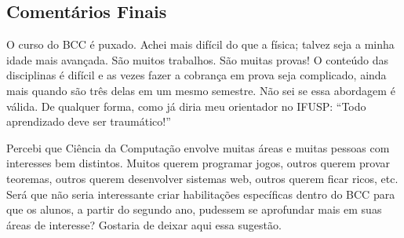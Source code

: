 \subsection{Comentários Finais}

O curso do BCC é puxado. Achei mais difícil do que a física; talvez seja a minha idade mais
avançada. São muitos trabalhos. São muitas provas! O conteúdo das disciplinas é difícil e as vezes
fazer a cobrança em prova seja complicado, ainda mais quando são três delas em um mesmo semestre.
Não sei se essa abordagem é válida. De qualquer forma, como já diria meu orientador no IFUSP: ``Todo
aprendizado deve ser traumático!''

Percebi que Ciência da Computação envolve muitas áreas e muitas pessoas com interesses bem
distintos. Muitos querem programar jogos, outros querem provar teoremas, outros querem desenvolver
sistemas web, outros querem ficar ricos, etc. Será que não seria interessante criar habilitações
específicas dentro do BCC para que os alunos, a partir do segundo ano, pudessem se aprofundar mais
em suas áreas de interesse? Gostaria de deixar aqui essa sugestão.














